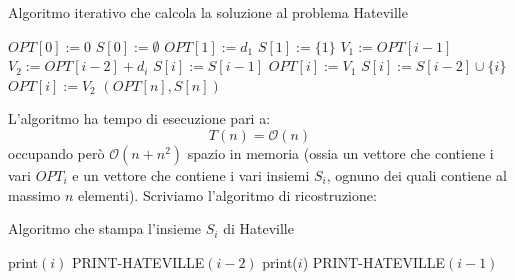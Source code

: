 \documentclass[12pt]{article}
\begin{document}
\begin{algorithm}[H]
    \caption{Algoritmo iterativo che calcola la soluzione al problema Hateville}
    \DontPrintSemicolon
     {
        $OPT[0] := 0$ \;
        $S[0] := \emptyset$ \;
        $OPT[1] := d_1$ \;
        $S[1] := \{1\}$ \;
         {
            $V_1 := OPT[i-1]$ \;
            $V_2 := OPT[i-2] + d_i$ \;
             {
                $S[i] := S[i-1]$ \;
                $OPT[i] := V_1$
            } {
                $S[i] := S[i-2] \cup \{i\}$ \;
                $OPT[i] := V_2$
            }
        }
        \Return $(OPT[n], S[n])$
    }
\end{algorithm} \noindent
L'algoritmo ha tempo di esecuzione pari a:
$$T(n) = \mathcal{O}(n)$$
occupando però $\mathcal{O}(n+n^2)$ spazio in memoria (ossia un vettore che contiene i vari $OPT_i$ e un vettore che contiene i vari insiemi $S_i$, ognuno dei quali contiene al massimo $n$ elementi).
Scriviamo l'algoritmo di ricostruzione: \newline
\begin{algorithm}[H]
    \caption{Algoritmo che stampa l'insieme $S_i$ di Hateville}
    \DontPrintSemicolon
     {
         {
             {
                print$(i)$
            } {
                 {
                    PRINT-HATEVILLE$(i-2)$ \;
                    print($i$)
                } {
                    PRINT-HATEVILLE$(i-1)$
                }
            }
        }
    }
\end{algorithm}
\end{document}
